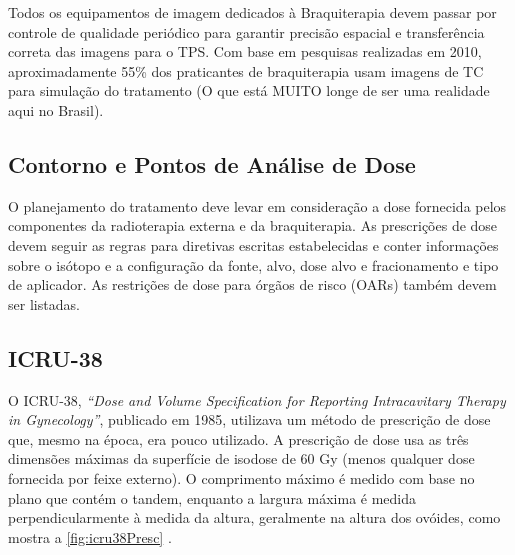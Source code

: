 \documentclass[11pt,a4paper]{article}
\begin{document}
	Todos os equipamentos de imagem dedicados à Braquiterapia devem passar por controle de qualidade periódico para garantir precisão espacial e transferência correta das imagens para o TPS. Com base em pesquisas realizadas em 2010, aproximadamente 55\% dos praticantes de braquiterapia usam imagens de TC para simulação do tratamento (O que está MUITO longe de ser uma realidade aqui no Brasil). 

\subsection*{Contorno e Pontos de Análise de Dose}

	O planejamento do tratamento deve levar em consideração a dose fornecida pelos componentes da radioterapia externa e da braquiterapia. As prescrições de dose devem seguir as regras para diretivas escritas estabelecidas e conter informações sobre o isótopo e a configuração da fonte, alvo, dose alvo e fracionamento e tipo de aplicador. As restrições de dose para órgãos de risco (OARs) também devem ser listadas.

\subsection*{ICRU-38}

	O ICRU-38, \textit{``Dose and Volume Specification for Reporting Intracavitary Therapy in Gynecology''}, publicado em 1985, utilizava um método de prescrição de dose que, mesmo na época, era pouco utilizado. A prescrição de dose usa as três dimensões máximas da superfície de isodose de 60 Gy (menos qualquer dose fornecida por feixe externo). O comprimento máximo é medido com base no plano que contém o tandem, enquanto a largura máxima é medida perpendicularmente à medida da altura, geralmente na altura dos ovóides, como mostra a \ref{fig:icru38Presc} .
\end{document}

